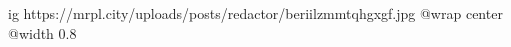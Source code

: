  
 
 
 
 

\ifcmt
  ig https://mrpl.city/uploads/posts/redactor/beriilzmmtqhgxgf.jpg
  @wrap center
  @width 0.8
\fi
